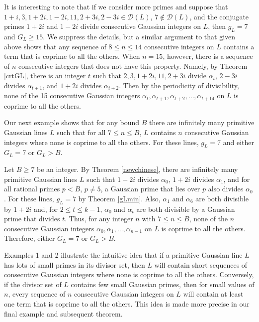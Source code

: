 \documentclass[11pt]{article}
\newcommand{\DL}{{\mathcal{D}}(L)}
\begin{document}
It is interesting to note that if we consider more primes and suppose that $1+i, 3, 1+2i,1-2i, 11, 2+3i, 2-3i\in\DL$, $7\not\in\DL$, and the conjugate primes $1+2i$ and $1-2i$ divide consecutive Gaussian integers on $L$, then $g_L=7$ and $G_L\geq 15$.  We suppress the details, but a similar argument to that given above shows that any sequence of  $8\leq n\leq 14$ consecutive integers on $L$  contains a term that is coprime to all the others.  When $n=15$, however, there is a sequence of $n$ consecutive integers that does not have this property.  Namely, by Theorem \ref{crtGL}, there is an integer $t$ such that $2, 3, 1+2i, 11, 2+3i$ divide $\alpha_t$, $2-3i$ divides $\alpha_{t+1}$, and $1+2i$ divides $\alpha_{t+2}$.  Then by the periodicity of divisibility, 
none of the 15 consecutive Gaussian integers $\alpha_{t}, \alpha_{t+1}, \alpha_{t+2}, \ldots , \alpha_{t+14}$  on $L$ is coprime to all the others. 

\bigskip

Our next example shows that for any bound $B$ there are infinitely many primitive Gaussian lines $L$ such that for all  $7\leq n\leq B$, $L$ contains $n$ consecutive Gaussian integers where none is coprime to all the others.  For these lines, $g_L=7$ and either $G_L=7$ or $G_L>B$.

\bigskip

  Let  $B\geq 7$ be an integer. By Theorem \ref{newchinese}, there are infinitely many primitive Gaussian lines $L$ such that 
$1-2i$ divides $\alpha_0$, 
$1+2i$ divides $\alpha_1$, and for all rational primes $p<B$, $p\neq 5$, a Gaussian prime that lies over  $p$ also divides $\alpha_0$.  For these lines, $g_L=7$ by Theorem \ref{gLmin}.  Also, 
$\alpha_1$ and $\alpha_6$ are both divisible by $1+2i$ and, for $2\leq t\leq k-1$,  $\alpha_0$ and $\alpha_t$ are both divisible by a Gaussian prime that divides $t$. Thus, for any integer $n$ with $7\leq n\leq B$, none of the $n$ consecutive Gaussian integers $\alpha_0, \alpha_1, \ldots, \alpha_{n-1}$   on $L$ is  coprime to all the others. Therefore, either $G_L=7$ or $G_L>B$.

\bigskip

Examples 1 and 2  illustrate the intuitive idea that if a primitive Gaussian line $L$ has lots of small primes in its divisor set, then $L$ will contain short sequences of consecutive Gaussian integers where none is coprime to all the others. Conversely,  if the divisor set of $L$ contains few small Gaussian primes, then for small values of $n$, every sequence of $n$ consecutive Gaussian integers on $L$ will contain at least one term that is coprime to all the others.  This idea is made more precise in our final example and subsequent theorem.
\end{document}
